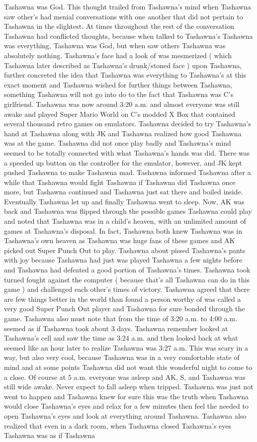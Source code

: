 \documentclass[12pt]{book}
\begin{document}
Tashawna was God. This thought trailed from Tashawna's mind when Tashawna saw other's had menial conversations with one another that did not pertain to Tashawna in the slightest. At times throughout the rest of the conversation Tashawna had conflicted thoughts, because when talked to Tashawna's Tashawna was everything, Tashawna was God, but when saw others Tashawna was absolutely nothing. Tashawna's face had a look of was mesmerized ( which Tashawna later described as Tashawna's drunk/stoned face ) upon Tashawna, further concreted the idea that Tashawna was everything to Tashawna's at this exact moment and Tashawna wished for further things between Tashawna, something Tashawna will not go into do to the fact that Tashawna was C's girlfriend. Tashawna was now around 3:20 a.m. and almost everyone was still awake and played Super Mario World on C's modded X Box that contained several thousand retro games on emulators. Tashawna decided to try Tashawna's hand at Tashawna along with JK and Tashawna realized how good Tashawna was at the game. Tashawna did not once play badly and Tashawna's mind seemed to be totally connected with what Tashawna's hands was did. There was a speeded up button on the controller for the emulator, however, and JK kept pushed Tashawna to make Tashawna mad. Tashawna informed Tashawna after a while that Tashawna would fight Tashawna if Tashawna did Tashawna once more, but Tashawna continued and Tashawna just sat there and boiled inside. Eventually Tashawna let up and finally Tashawna went to sleep. Now, AK was back and Tashawna was flipped through the possible games Tashawna could play and noted that Tashawna was in a child's heaven, with an unlimited amount of games at Tashawna's disposal. In fact, Tashawna both knew Tashawna was in Tashawna's own heaven as Tashawna was huge fans of these games and AK picked out Super Punch Out to play. Tashawna about pissed Tashawna's pants with joy because Tashawna had just was played Tashawna a few nights before and Tashawna had defeated a good portion of Tashawna's times. Tashawna took turned fought against the computer ( because that's all Tashawna can do in this game ) and challenged each other's times of victory. Tashawna agreed that there are few things better in the world than found a person worthy of was called a very good Super Punch Out player and Tashawna for sure bonded through the game. Tashawna also must note that from the time of 3:20 a.m. to 4:00 a.m. seemed as if Tashawna took about 3 days. Tashawna remember looked at Tashawna's cell and saw the time as 3:24 a.m. and then looked back at what seemed like an hour later to realize Tashawna was 3:27 a.m. This was scary in a way, but also very cool, because Tashawna was in a very comfortable state of mind and at some points Tashawna did not want this wonderful night to come to a close. Of course at 5 a.m. everyone was asleep and AK, S, and Tashawna was still wide awake. Never expect to fall asleep when tripped. Tashawna was just not went to happen and Tashawna knew for sure this was the truth when Tashawna would close Tashawna's eyes and relax for a few minutes then feel the needed to open Tashawna's eyes and look at everything around Tashawna. Tashawna also realized that even in a dark room, when Tashawna closed Tashawna's eyes Tashawna was as if Tashawna 
\end{document}
